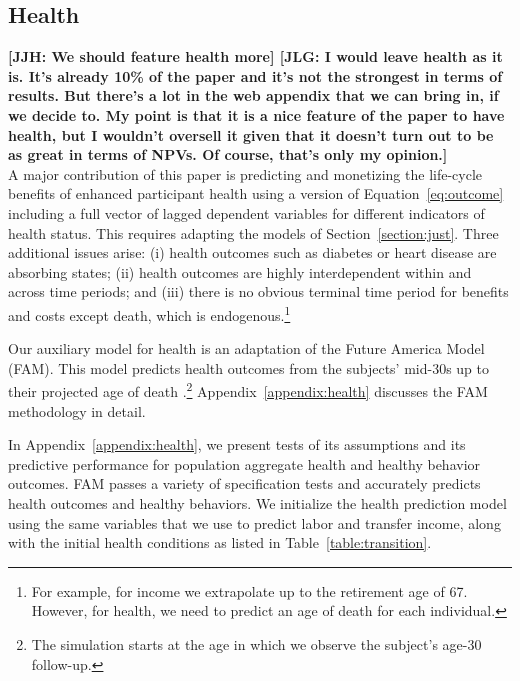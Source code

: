 \subsection{Health} \label{section:health}

\textbf{[JJH: We should feature health more] [JLG: I would leave health as it is. It's already 10\% of the paper and it's not the strongest in terms of results. But there's a lot in the web appendix that we can bring in, if we decide to. My point is that it is a nice feature of the paper to have health, but I wouldn't oversell it given that it doesn't turn out to be as great in terms of NPVs. Of course, that's only my opinion.]}\\

A major contribution of this paper is predicting and monetizing the life-cycle benefits of enhanced participant health using a version of Equation~\eqref{eq:outcome} including a full vector of lagged dependent variables for different indicators of health status. This requires adapting the models of Section~\ref{section:just}. Three additional issues arise: (i) health outcomes such as diabetes or heart disease are absorbing states; (ii) health outcomes are highly interdependent within and across time periods; and (iii) there is no obvious terminal time period for benefits and costs except death, which is endogenous.\footnote{For example, for income we extrapolate up to the retirement age of 67. However, for health, we need to predict an age of death for each individual.}

Our auxiliary model for health is an adaptation of the Future America Model (FAM). This model predicts health outcomes from the subjects' mid-30s up to their projected age of death \citep{Goldman_etal_2015_Future-Elderly-Model-Report}.\footnote{The simulation starts at the age in which we observe the subject's age-30 follow-up.}  Appendix~\ref{appendix:health} discusses the FAM methodology in detail.

In  Appendix~\ref{appendix:health}, we present tests of its assumptions and its predictive performance for population aggregate health and healthy behavior outcomes. FAM passes a variety of specification tests and accurately predicts health outcomes and healthy behaviors. We initialize the health prediction model using the same variables that we use to predict labor and transfer income, along with the initial health conditions as listed in Table~\ref{table:transition}.

